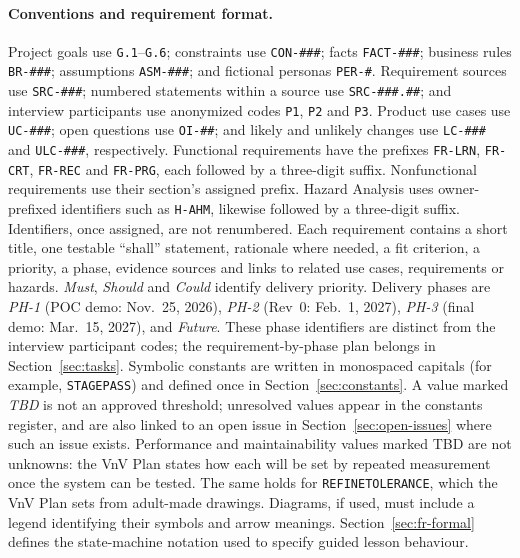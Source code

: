 \documentclass[12pt]{article}
\renewcommand{\_}{\textunderscore\allowbreak}%
\begin{document}
\paragraph{Conventions and requirement format.}
Project goals use \texttt{G.1}--\texttt{G.6}; constraints use
\texttt{CON-\#\#\#}; facts \texttt{FACT-\#\#\#}; business rules
\texttt{BR-\#\#\#}; assumptions \texttt{ASM-\#\#\#}; and fictional personas
\texttt{PER-\#}. Requirement sources use \texttt{SRC-\#\#\#}; numbered
statements within a source use \texttt{SRC-\#\#\#.\#\#}; and interview
participants use anonymized codes \texttt{P1}, \texttt{P2} and \texttt{P3}.
Product use cases use \texttt{UC-\#\#\#}; open questions use \texttt{OI-\#\#};
and likely and unlikely changes use \texttt{LC-\#\#\#} and \texttt{ULC-\#\#\#},
respectively. Functional requirements have the prefixes \texttt{FR-LRN},
\texttt{FR-CRT}, \texttt{FR-REC} and \texttt{FR-PRG}, each followed by a
three-digit suffix. Nonfunctional requirements use their section's assigned
prefix. Hazard Analysis uses owner-prefixed identifiers such as \texttt{H-AHM},
likewise followed by a three-digit suffix. Identifiers, once assigned, are not
renumbered. Each requirement contains a short title, one testable ``shall''
statement, rationale where needed, a fit criterion, a priority, a phase,
evidence sources and links to related use cases, requirements or hazards.
\emph{Must}, \emph{Should} and \emph{Could} identify delivery priority. Delivery
phases are \emph{PH-1} (POC demo: Nov.~25, 2026), \emph{PH-2} (Rev~0: Feb.~1,
2027), \emph{PH-3} (final demo: Mar.~15, 2027), and \emph{Future}. These phase
identifiers are distinct from the interview participant codes; the
requirement-by-phase plan belongs in Section~\ref{sec:tasks}. Symbolic constants
are written in monospaced capitals (for example, \texttt{STAGE\_PASS}) and
defined once in Section~\ref{sec:constants}. A value marked \emph{TBD} is not an
approved threshold; unresolved values appear in the constants register, and are
also linked to an open issue in Section~\ref{sec:open-issues} where such an
issue exists. Performance and maintainability values marked TBD are not unknowns: the
VnV Plan states how each will be set by repeated measurement once the system
can be tested. The same holds for \texttt{REFINE\_TOLERANCE}, which the VnV
Plan sets from adult-made drawings. Diagrams, if used, must include a legend identifying their symbols
and arrow meanings. Section~\ref{sec:fr-formal} defines the state-machine
notation used to specify guided lesson behaviour.
\end{document}

